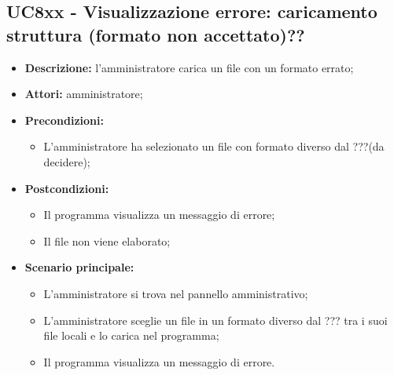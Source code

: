 \documentclass[5pt]{article}
\begin{document}
\subsection{UC8xx - Visualizzazione errore: caricamento struttura (formato non accettato)??}
\label{sec:UC8xxx}
\begin{itemize}
    \item \textbf{Descrizione:} l’amministratore carica un file con un formato errato;
    \item \textbf{Attori:} amministratore;
    \item \textbf{Precondizioni:} 
    \begin{itemize}
        \item L’amministratore ha selezionato un file con formato diverso dal ???(da decidere);
    \end{itemize}
    \item \textbf{Postcondizioni:} 
    \begin{itemize}
        \item Il programma visualizza un messaggio di errore;
        \item Il file non viene elaborato;
    \end{itemize}
    \item \textbf{Scenario principale:} 
    \begin{itemize}
        \item L’amministratore si trova nel pannello amministrativo;
        \item L’amministratore sceglie un file in un formato diverso dal ??? tra i suoi file locali e lo carica nel programma;
        \item Il programma visualizza un messaggio di errore.
    \end{itemize}
\end{itemize}
\end{document}
